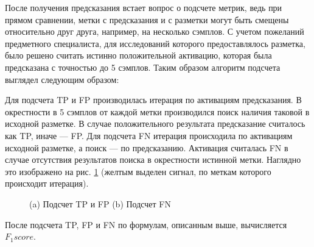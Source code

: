 После получения предсказания встает вопрос о подсчете метрик, ведь при прямом
сравнении, метки с предсказания и с разметки могут быть смещены относительно
друг друга, например, на несколько сэмплов. С учетом пожеланий предметного
специалиста, для исследований которого предоставлялось разметка, было решено
считать истинно положительной активацию, которая была предсказана с точностью
до 5 сэмплов. Таким образом алгоритм подсчета выглядел следующим образом:

Для подсчета TP и FP производилась итерация по активациям предсказания. В
окрестности в 5 сэмплов от каждой метки производился поиск наличия таковой в
исходной разметке. В случае положительного результата предсказание считалось
как TP, иначе --- FP. Для подсчета FN итерация происходила по активациям исходной
разметке, а поиск --- по предсказанию. Активация считалась FN в случае
отсутствия результатов поиска в окрестности истинной метки. Наглядно это
изображено на рис. \ref{fig:metrics} (желтым выделен сигнал, по меткам которого
происходит итерация).

\begin{figure}[!htb]
	\centering
	\label{fig:metrics}
	\caption{(a) Подсчет TP и FP (b) Подсчет FN}
\end{figure}

После подсчета TP, FP и FN по формулам, описанным выше, вычисляется $F_1score$.
